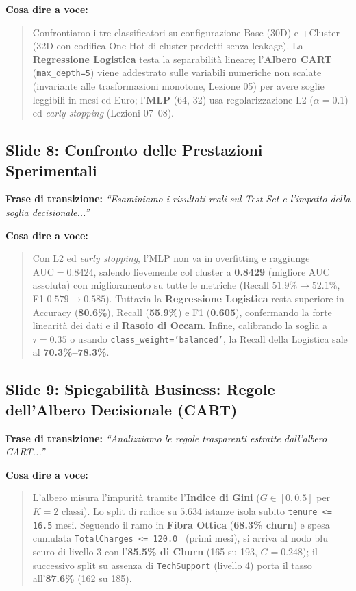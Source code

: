 \documentclass[11pt, a4paper]{article}
\begin{document}
\noindent \textbf{Cosa dire a voce:}
\begin{quote}
Confrontiamo i tre classificatori su configurazione Base (30D) e +Cluster (32D con codifica One-Hot di cluster predetti senza leakage). La \textbf{Regressione Logistica} testa la separabilità lineare; l'\textbf{Albero CART} (\texttt{max\_depth=5}) viene addestrato sulle variabili numeriche non scalate (invariante alle trasformazioni monotone, Lezione 05) per avere soglie leggibili in mesi ed Euro; l'\textbf{MLP} (64, 32) usa regolarizzazione L2 ($\alpha=0.1$) ed \textit{early stopping} (Lezioni 07--08).
\end{quote}

\subsection*{Slide 8: Confronto delle Prestazioni Sperimentali}
\noindent \textbf{Frase di transizione:} \textit{``Esaminiamo i risultati reali sul Test Set e l'impatto della soglia decisionale...''}

\noindent \textbf{Cosa dire a voce:}
\begin{quote}
Con L2 ed \textit{early stopping}, l'MLP non va in overfitting e raggiunge $\text{AUC} = 0.8424$, salendo lievemente col cluster a \textbf{0.8429} (migliore AUC assoluta) con miglioramento su tutte le metriche (Recall $51.9\% \rightarrow 52.1\%$, F1 $0.579 \rightarrow 0.585$). Tuttavia la \textbf{Regressione Logistica} resta superiore in Accuracy (\textbf{80.6\%}), Recall (\textbf{55.9\%}) e F1 (\textbf{0.605}), confermando la forte linearità dei dati e il \textbf{Rasoio di Occam}. Infine, calibrando la soglia a $\tau=0.35$ o usando \texttt{class\_weight='balanced'}, la Recall della Logistica sale al \textbf{70.3\%--78.3\%}.
\end{quote}

\subsection*{Slide 9: Spiegabilità Business: Regole dell'Albero Decisionale (CART)}
\noindent \textbf{Frase di transizione:} \textit{``Analizziamo le regole trasparenti estratte dall'albero CART...''}

\noindent \textbf{Cosa dire a voce:}
\begin{quote}
L'albero misura l'impurità tramite l'\textbf{Indice di Gini} ($G \in [0, 0.5]$ per $K=2$ classi). Lo split di radice su $5.634$ istanze isola subito \texttt{tenure <= 16.5} mesi. Seguendo il ramo in \textbf{Fibra Ottica} (\textbf{68.3\% churn}) e spesa cumulata \texttt{TotalCharges <= 120.0\,\texteuro} (primi mesi), si arriva al nodo blu scuro di livello 3 con l'\textbf{85.5\% di Churn} (165 su 193, $G=0.248$); il successivo split su assenza di \texttt{TechSupport} (livello 4) porta il tasso all'\textbf{87.6\%} (162 su 185).
\end{quote}
\end{document}
